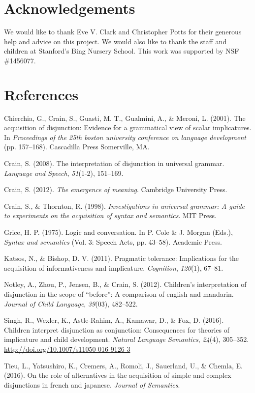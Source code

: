 \documentclass[10pt, letterpaper]{article}
\begin{document}
\section{Acknowledgements}\label{acknowledgements}

We would like to thank Eve V. Clark and Christopher Potts for their
generous help and advice on this project. We would also like to thank
the staff and children at Stanford's Bing Nursery School. This work was
supported by NSF \#1456077.

\section{References}\label{references}

\setlength{\parindent}{-0.1in} \setlength{\leftskip}{0.125in} \noindent

\hypertarget{refs}{}
\hypertarget{ref-chierchia2001acquisition}{}
Chierchia, G., Crain, S., Guasti, M. T., Gualmini, A., \& Meroni, L.
(2001). The acquisition of disjunction: Evidence for a grammatical view
of scalar implicatures. In \emph{Proceedings of the 25th boston
university conference on language development} (pp. 157--168).
Cascadilla Press Somerville, MA.

\hypertarget{ref-crain2008interpretation}{}
Crain, S. (2008). The interpretation of disjunction in universal
grammar. \emph{Language and Speech}, \emph{51}(1-2), 151--169.

\hypertarget{ref-crain2012emergence}{}
Crain, S. (2012). \emph{The emergence of meaning}. Cambridge University
Press.

\hypertarget{ref-crain1998investigations}{}
Crain, S., \& Thornton, R. (1998). \emph{Investigations in universal
grammar: A guide to experiments on the acquisition of syntax and
semantics}. MIT Press.

\hypertarget{ref-grice1975logicconvo}{}
Grice, H. P. (1975). Logic and conversation. In P. Cole \& J. Morgan
(Eds.), \emph{Syntax and semantics} (Vol. 3: Speech Acts, pp. 43--58).
Academic Press.

\hypertarget{ref-katsos2011pragmatic}{}
Katsos, N., \& Bishop, D. V. (2011). Pragmatic tolerance: Implications
for the acquisition of informativeness and implicature.
\emph{Cognition}, \emph{120}(1), 67--81.

\hypertarget{ref-notley2012children}{}
Notley, A., Zhou, P., Jensen, B., \& Crain, S. (2012). Children's
interpretation of disjunction in the scope of ``before'': A comparison
of english and mandarin. \emph{Journal of Child Language},
\emph{39}(03), 482--522.

\hypertarget{ref-Singh2016}{}
Singh, R., Wexler, K., Astle-Rahim, A., Kamawar, D., \& Fox, D. (2016).
Children interpret disjunction as conjunction: Consequences for theories
of implicature and child development. \emph{Natural Language Semantics},
\emph{24}(4), 305--352. \url{http://doi.org/10.1007/s11050-016-9126-3}

\hypertarget{ref-tieu2016}{}
Tieu, L., Yatsushiro, K., Cremers, A., Romoli, J., Sauerland, U., \&
Chemla, E. (2016). On the role of alternatives in the acquisition of
simple and complex disjunctions in french and japanese. \emph{Journal of
Semantics}.
\end{document}
